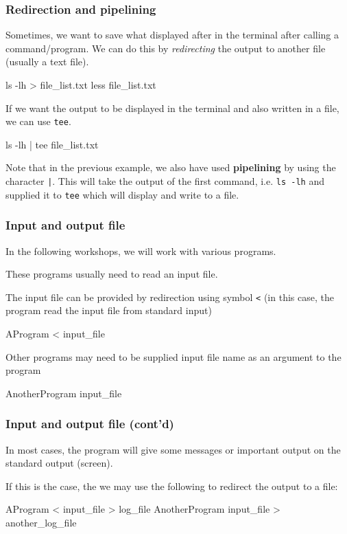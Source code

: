 \documentclass[english,11pt]{beamer}
\begin{document}
\begin{frame}[fragile]
\frametitle{Redirection and pipelining}

Sometimes, we want to save what displayed after in the terminal after
calling a command/program. We can do this by \textit{redirecting} the output
to another file (usually a text file).
\begin{bashcode}
ls -lh > file_list.txt
less file_list.txt
\end{bashcode}

If we want the output to be displayed in the terminal and also written
in a file, we can use \verb|tee|.
\begin{bashcode}
ls -lh | tee file_list.txt
\end{bashcode}
Note that in the previous example, we also have used \textbf{pipelining} by
using the character \texttt{|}. This will take the output of the first command,
i.e. \verb|ls -lh| and supplied it to \verb|tee| which will display and write
to a file.

\end{frame}



\begin{frame}[fragile]
\frametitle{Input and output file}

In the following workshops, we will work with various programs.

These programs usually need to read an input file.

The input file can be provided by redirection using symbol \verb|<| (in this
case, the program read the input file from standard input)
\begin{bashcode}
AProgram < input_file
\end{bashcode}

Other programs may need to be supplied input file name as an argument to
the program
\begin{bashcode}
AnotherProgram input_file
\end{bashcode}
\end{frame}


\begin{frame}[fragile]
\frametitle{Input and output file (cont'd)}

In most cases, the program will give some messages or important output on
the standard output (screen).

If this is the case, the we may use the following to redirect the output
to a file:
\begin{bashcode}
AProgram < input_file > log_file
AnotherProgram input_file > another_log_file
\end{bashcode}

\end{frame}
\end{document}
